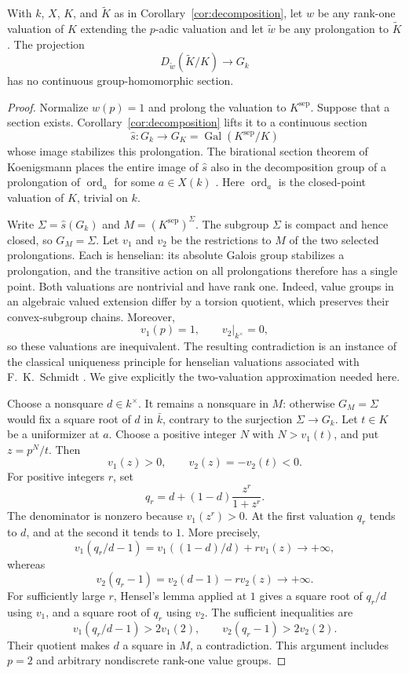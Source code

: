 \begin{lemma}\label{lem:no-rank-one-section}
With $k$, $X$, $K$, and $\widetilde K$ as in
Corollary~\ref{cor:decomposition}, let $w$ be any rank-one valuation of
$K$ extending the $p$-adic valuation and let $\widetilde w$ be any
prolongation to $\widetilde K$.  The projection
\[
 D_{\widetilde w}(\widetilde K/K)\longrightarrow G_k
\]
has no continuous group-homomorphic section.
\end{lemma}

\begin{proof}
Normalize $w(p)=1$ and prolong the valuation to $K^{\mathrm{sep}}$.
Suppose that a section exists.  Corollary~\ref{cor:decomposition} lifts
it to a continuous section
\[
 \widehat s:G_k\longrightarrow G_K
       =\operatorname{Gal}(K^{\mathrm{sep}}/K)
\]
whose image stabilizes this prolongation.  The birational section
theorem of Koenigsmann places the entire image of $\widehat s$ also in
the decomposition group of a prolongation of $\operatorname{ord}_a$ for
some $a\in X(k)$ \cite[preprint version, Proposition~2.4(2), Definition~1.4, and
Observation~1.3]{Koenigsmann}.  Here $\operatorname{ord}_a$ is the
closed-point valuation of $K$, trivial on $k$.

Write $\Sigma=\widehat s(G_k)$ and $M=(K^{\mathrm{sep}})^\Sigma$.
The subgroup $\Sigma$ is compact and hence closed, so
$G_M=\Sigma$.  Let $v_1$ and $v_2$ be the restrictions to $M$ of the two
selected prolongations.  Each is henselian: its absolute Galois group
stabilizes a prolongation, and the transitive action on all
prolongations therefore has a single point.  Both valuations are
nontrivial and have rank one.  Indeed, value groups in an algebraic
valued extension differ by a torsion quotient, which preserves their
convex-subgroup chains.  Moreover,
\[
 v_1(p)=1,\qquad v_2|_{k^\times}=0,
\]
so these valuations are inequivalent.  The resulting contradiction is
an instance of the classical uniqueness principle for henselian
valuations associated with F.~K.~Schmidt \cite{SchmidtValuations}.
We give explicitly the two-valuation approximation needed here.

Choose a nonsquare $d\in k^\times$.  It remains a nonsquare in $M$:
otherwise $G_M=\Sigma$ would fix a square root of $d$ in $\bar k$,
contrary to the surjection $\Sigma\to G_k$.  Let $t\in K$ be a
uniformizer at $a$.  Choose a positive integer $N$ with $N>v_1(t)$,
and put $z=p^N/t$.  Then
\[
 v_1(z)>0,\qquad v_2(z)=-v_2(t)<0.
\]
For positive integers $r$, set
\[
 q_r=d+(1-d)\frac{z^r}{1+z^r}.
\]
The denominator is nonzero because $v_1(z^r)>0$.  At the first
valuation $q_r$ tends to $d$, and at the second it tends to $1$.
More precisely,
\[
 v_1(q_r/d-1)
   =v_1((1-d)/d)+r v_1(z)\longrightarrow+\infty,
\]
whereas
\[
 v_2(q_r-1)
   =v_2(d-1)-r v_2(z)\longrightarrow+\infty.
\]
For sufficiently large $r$, Hensel's lemma applied at $1$ gives a
square root of $q_r/d$ using $v_1$, and a square root of $q_r$ using
$v_2$.  The sufficient inequalities are
\[
 v_1(q_r/d-1)>2v_1(2),\qquad
 v_2(q_r-1)>2v_2(2).
\]
Their quotient makes $d$ a square in $M$, a contradiction.  This
argument includes $p=2$ and arbitrary nondiscrete rank-one value groups.
\end{proof}

